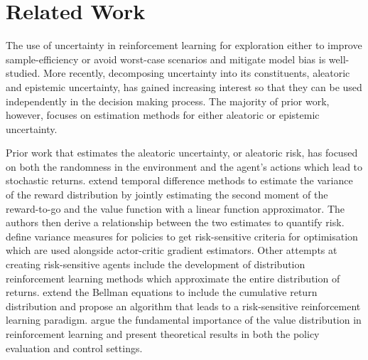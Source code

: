 \section{Related Work} %
\label{S:related-work}
The use of uncertainty in reinforcement learning for exploration either to improve sample-efficiency \citep{schneider1997exploiting}\citep{jung2010gaussian}\citep{deisenroth2011pilco} or avoid worst-case scenarios and mitigate model bias \citep{bagnell2001solving}\citep{nilim2005robust}\citep{kahn2017uncertainty}\citep{deisenroth2013gaussian} is well-studied. More recently, decomposing uncertainty into its constituents, aleatoric and epistemic uncertainty, has gained increasing interest so that they can be used independently in the decision making process. The majority of prior work, however, focuses on estimation methods for either aleatoric or epistemic uncertainty.

Prior work that estimates the aleatoric uncertainty, or aleatoric risk, has focused on both the randomness in the environment and the agent's actions which lead to stochastic returns. \citet{tamar2016learning} extend temporal difference methods to estimate the variance of the reward distribution by jointly estimating the second moment of the reward-to-go and the value function with a linear function approximator. The authors then derive a relationship between the two estimates to quantify risk. \citet{prashanth2013actor} define variance measures for policies to get risk-sensitive criteria for optimisation which are used alongside actor-critic gradient estimators. Other attempts at creating risk-sensitive agents include the development of distribution reinforcement learning methods which approximate the entire distribution of returns. \citet{morimura2010nonparametric} extend the Bellman equations to include the cumulative return distribution and propose an algorithm that leads to a risk-sensitive reinforcement learning paradigm. \citet{bellemare2017distributional} argue the fundamental importance of the value distribution in reinforcement learning and present theoretical results in both the policy evaluation and control settings. 

